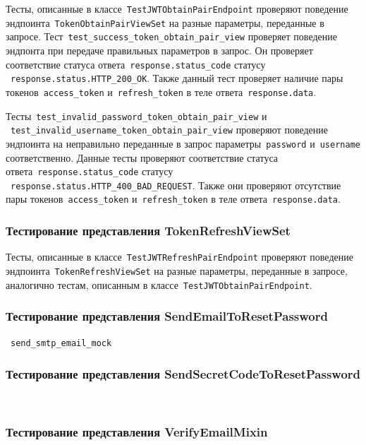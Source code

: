 Тесты, описанные в классе~\lstinline{TestJWTObtainPairEndpoint} проверяют поведение эндпоинта~\lstinline{TokenObtainPairViewSet} на
разные параметры, переданные в запросе.
Тест~\lstinline{test_success_token_obtain_pair_view} проверяет поведение эндпонта при передаче правильных параметров в запрос.
Он проверяет соответствие статуса ответа~\lstinline{response.status_code} статусу ~\lstinline{response.status.HTTP_200_OK}.
Также данный тест проверяет наличие пары токенов~\lstinline{access_token} и~\lstinline{refresh_token} в теле ответа~\lstinline{response.data}.

Тесты~\lstinline{test_invalid_password_token_obtain_pair_view} и
~\lstinline{test_invalid_username_token_obtain_pair_view} проверяют поведение эндпоинта на
неправильно переданные в запрос параметры~\lstinline{password} и~\lstinline{username} соответственно.
Данные тесты проверяют соответствие статуса ответа~\lstinline{response.status_code} статусу ~\lstinline{response.status.HTTP_400_BAD_REQUEST}.
Также они проверяют отсутствие пары токенов~\lstinline{access_token} и~\lstinline{refresh_token} в теле ответа~\lstinline{response.data}.

\subsubsection{Тестирование представления TokenRefreshViewSet}

Тесты, описанные в классе~\lstinline{TestJWTRefreshPairEndpoint} проверяют поведение эндпоинта~\lstinline{TokenRefreshViewSet} на
разные параметры, переданные в запросе, аналогично тестам, описанным в классе~\lstinline{TestJWTObtainPairEndpoint}.

\subsubsection{Тестирование представления SendEmailToResetPassword}
~\lstinline{send_smtp_email_mock}


\subsubsection{Тестирование представления SendSecretCodeToResetPassword}
~\lstinline{}


\subsubsection{Тестирование представления VerifyEmailMixin}
~\lstinline{}


